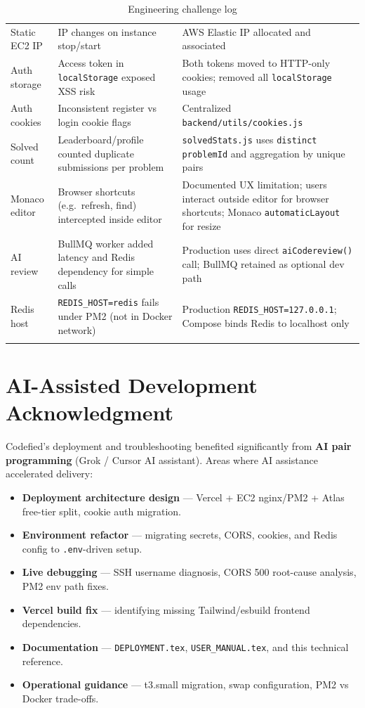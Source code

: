 \documentclass[11pt,a4paper]{article}
\begin{document}
\begin{longtable}{@{}p{3.3cm}p{4cm}p{6.3cm}@{}}
\addlinespace
Static EC2 IP &
IP changes on instance stop/start &
AWS Elastic IP allocated and associated \\
\addlinespace
Auth storage &
Access token in \texttt{localStorage} exposed XSS risk &
Both tokens moved to HTTP-only cookies; removed all \texttt{localStorage} usage \\
\addlinespace
Auth cookies &
Inconsistent register vs login cookie flags &
Centralized \texttt{backend/utils/cookies.js} \\
\addlinespace
Solved count &
Leaderboard/profile counted duplicate submissions per problem &
\texttt{solvedStats.js} uses \texttt{distinct problemId} and aggregation by unique pairs \\
\addlinespace
Monaco editor &
Browser shortcuts (e.g.\ refresh, find) intercepted inside editor &
Documented UX limitation; users interact outside editor for browser shortcuts; Monaco \texttt{automaticLayout} for resize \\
\addlinespace
AI review &
BullMQ worker added latency and Redis dependency for simple calls &
Production uses direct \texttt{aiCodereview()} call; BullMQ retained as optional dev path \\
\addlinespace
Redis host &
\texttt{REDIS\_HOST=redis} fails under PM2 (not in Docker network) &
Production \texttt{REDIS\_HOST=127.0.0.1}; Compose binds Redis to localhost only \\
\bottomrule
\caption{Engineering challenge log}
\end{longtable}

\section{AI-Assisted Development Acknowledgment}

Codefied's deployment and troubleshooting benefited significantly from \textbf{AI pair programming} (Grok / Cursor AI assistant). Areas where AI assistance accelerated delivery:

\begin{itemize}[noitemsep]
  \item \textbf{Deployment architecture design} --- Vercel + EC2 nginx/PM2 + Atlas free-tier split, cookie auth migration.
  \item \textbf{Environment refactor} --- migrating secrets, CORS, cookies, and Redis config to \texttt{.env}-driven setup.
  \item \textbf{Live debugging} --- SSH username diagnosis, CORS 500 root-cause analysis, PM2 env path fixes.
  \item \textbf{Vercel build fix} --- identifying missing Tailwind/esbuild frontend dependencies.
  \item \textbf{Documentation} --- \texttt{DEPLOYMENT.tex}, \texttt{USER\_MANUAL.tex}, and this technical reference.
  \item \textbf{Operational guidance} --- t3.small migration, swap configuration, PM2 vs Docker trade-offs.
\end{itemize}
\end{document}
